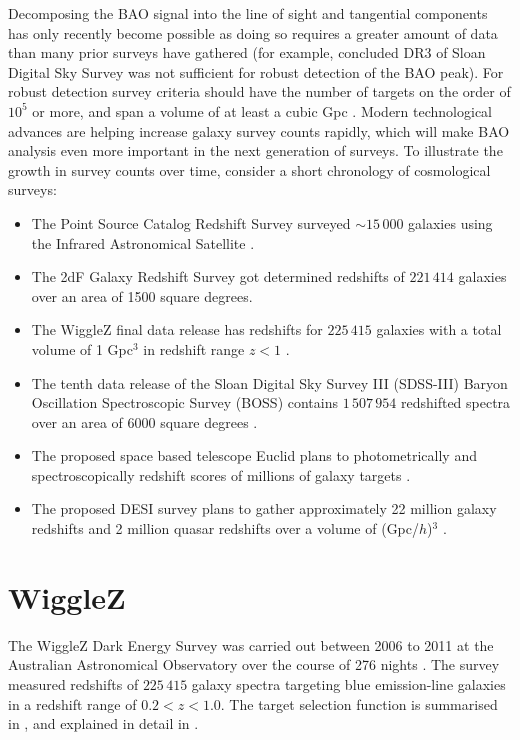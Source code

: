 \documentclass[titlesmallcaps, examinerscopy, copyrightpage]{uqthesis}
\begin{document}
Decomposing the BAO signal into the line of sight and tangential components has only recently become possible as doing so requires a greater amount of data than many prior surveys have gathered (for example, \citet{OkumuraMatsubara2008} concluded DR3 of Sloan Digital Sky Survey was not sufficient for robust detection of the BAO peak). For robust detection survey criteria should have the number of targets on the order of $10^5$ or more, and span a volume of at least a cubic Gpc \citep{Tegmark1997,BlakeGlazebrook2003,BlakeParkinson2006}. Modern technological advances are helping increase galaxy survey counts rapidly, which will make BAO analysis even more important in the next generation of surveys. To illustrate the growth in survey counts over time, consider a short chronology of cosmological surveys:
\begin{itemize}
\item The Point Source Catalog Redshift Survey surveyed $\sim 15\,000$ galaxies using the Infrared Astronomical Satellite \citep{SaundersSutherland2000}.
\item The 2dF Galaxy Redshift Survey got determined redshifts of $221\,414$ galaxies \citep{CollessPeterson2003} over an area of 1500 square degrees.
\item The WiggleZ final data release has redshifts for $225\,415$ galaxies with a total volume of 1 Gpc$^3$ in redshift range $z < 1$ \citep{Drinkwater2010, Parkinson2012}.
\item The tenth data release of the Sloan Digital Sky Survey III (SDSS-III) Baryon Oscillation Spectroscopic Survey (BOSS) contains $1\,507\,954$ redshifted spectra over an area of 6000 square degrees \citep{AhnAlexandroff2014}.
\item The proposed space based telescope Euclid plans to photometrically and spectroscopically redshift scores of millions of galaxy targets \citep{CimattiRobberto2009,WangPercival2010}.
\item The proposed DESI survey plans to gather approximately 22 million galaxy redshifts and 2 million quasar redshifts over a volume of (Gpc/$h$)$^3$ \citep{LeviBebek2013}.
\end{itemize}






\section{WiggleZ} \label{sec:wigglez}

The WiggleZ Dark Energy Survey was carried out between 2006 to 2011 at the Australian Astronomical Observatory over the course of 276 nights \citep{Drinkwater2010}. The survey measured redshifts of $225\,415$ galaxy spectra targeting blue emission-line galaxies in a redshift range of $0.2 < z < 1.0$. The target selection function is summarised in \citet{BlakeDavis2011}, and explained in detail in \citet{BlakeBrough2010}. \\
\end{document}
